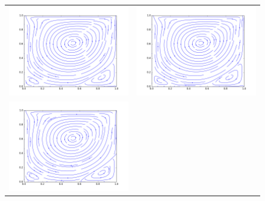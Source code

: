 \begin{figure}
	\centering
	\begin{tabulary}{\linewidth}{c c}
		\includegraphics[width=\figwid]{figs/lid/power_bgk_100_n1.5_Re1000/sl_step-000050000}
		&
		\includegraphics[width=\figwid]{figs/lid/power_svec_100_n1.5_Re1000/sl_step-000050000}
		\\
		\includegraphics[width=\figwid]{figs/lid/power_bgk-filter_100_n1.5_Re1000/sl_step-000050000}

\end{tabulary}
\end{figure}
